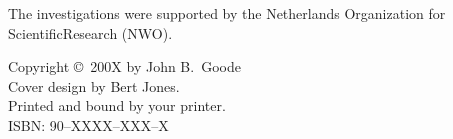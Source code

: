 {%
%
\noindent%
The investigations were supported by the Netherlands 
Organization for Scientific\linebreak Research (NWO).
\par\vspace {2cm}

%

%
\noindent%
Copyright \copyright\ 200X by John B.\ Goode\\[2ex] %
Cover design by Bert Jones.\\                       %
Printed and bound by your printer.\\[2ex]           %
ISBN: 90--XXXX--XXX--X                              %



}
